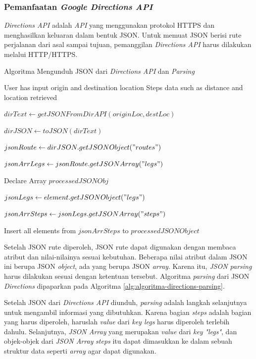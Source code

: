 \subsubsection{Pemanfaatan \textit{Google Directions API}}
\textit{Directions API} adalah \textit{API} yang menggunakan protokol HTTPS dan menghasilkan keluaran dalam bentuk JSON. Untuk memuat JSON berisi rute perjalanan dari asal sampai tujuan, pemanggilan \textit{Directions API} harus dilakukan melalui HTTP/HTTPS.

\begin{algorithm}
	\caption{Algoritma Mengunduh JSON dari \textit{Directions API} dan \textit{Parsing}}
	\label{alg:algoritma-directions-parsing}
	\begin{algorithmic}[1]
	\Require User has input origin and destination location 
	\Ensure Steps data such as distance and location retrieved
	
		\State $dirText \gets getJSONFromDirAPI(originLoc,destLoc)$ 
		
		\State $dirJSON \gets toJSON(dirText)$	
		
		\State $jsonRoute \gets dirJSON.getJSONObject("routes")$
		
		\State $jsonArrLegs \gets jsonRoute.getJSONArray("legs")$

		\State Declare Array $processedJSONObj$		
		
		\State $jsonLegs \gets element.getJSONObject("legs") $

		\State $jsonArrSteps \gets jsonLegs.getJSONArray("steps")$		
		
		\State Insert all elements from $jsonArrSteps$ to $processedJSONObject$ 
		\EndFor
	\EndFunction  
	\end{algorithmic}
\end{algorithm}

Setelah JSON rute diperoleh, JSON rute dapat digunakan dengan membaca atribut dan nilai-nilainya sesuai kebutuhan. Beberapa nilai atribut dalam JSON ini  berupa JSON \textit{object}, ada yang berupa JSON \textit{array}. Karena itu,  \textit{JSON parsing} harus dilakukan sesuai dengan ketentuan tersebut. Algoritma \textit{parsing} dari JSON \textit{Directions} dipaparkan pada Algoritma \ref{alg:algoritma-directions-parsing}. 

Setelah JSON dari \textit{Directions API} diunduh, \textit{parsing} adalah langkah selanjutnya untuk mengambil informasi yang dibutuhkan. Karena bagian \textit{steps} adalah bagian yang harus diperoleh, haruslah \textit{value} dari \textit{key legs} harus diperoleh terlebih dahulu. Selanjutnya, \textit{JSON Array} yang merupakan \textit{value} dari \textit{key} \textit{"legs"}, dan objek-objek dari \textit{JSON Array} \textit{steps} itu dapat dimasukkan ke dalam sebuah struktur data seperti \textit{array} agar dapat digunakan.  

